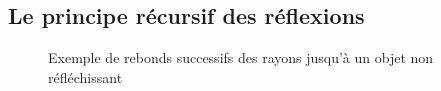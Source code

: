 \documentclass[11pt]{article}
\begin{document}
\begin{appendices}
		\subsection{Le principe récursif des réflexions}
		\begin{figure}[!h]

			\caption{Exemple de rebonds successifs des rayons jusqu'à un objet non réfléchissant}
			\label{reflectionsSchema}
		\end{figure}
		\FloatBarrier
		\label{annexe:reflexionsRecursives}
\FloatBarrier
\end{appendices}

\newpage%
\nocite{*}


\end{document}
